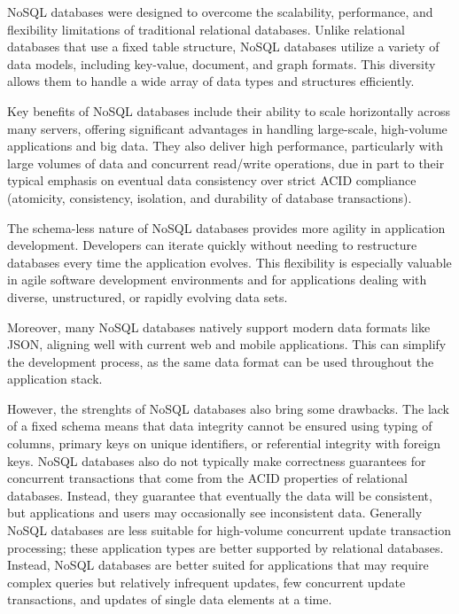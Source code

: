 NoSQL databases were designed to overcome the scalability, performance, and flexibility limitations of traditional relational databases. Unlike relational databases that use a fixed table structure, NoSQL databases utilize a variety of data models, including key-value, document, and graph formats. This diversity allows them to handle a wide array of data types and structures efficiently.

Key benefits of NoSQL databases include their ability to scale horizontally across many servers, offering significant advantages in handling large-scale, high-volume applications and big data. They also deliver high performance, particularly with large volumes of data and concurrent read/write operations, due in part to their typical emphasis on eventual data consistency over strict ACID compliance (atomicity, consistency, isolation, and durability of database transactions).

The schema-less nature of NoSQL databases provides more agility in application development. Developers can iterate quickly without needing to restructure databases every time the application evolves. This flexibility is especially valuable in agile software development environments and for applications dealing with diverse, unstructured, or rapidly evolving data sets.

Moreover, many NoSQL databases natively support modern data formats like JSON, aligning well with current web and mobile applications. This can simplify the development process, as the same data format can be used throughout the application stack.

However, the strenghts of NoSQL databases also bring some drawbacks. The lack of a fixed schema means that data integrity cannot be ensured using typing of columns, primary keys on unique identifiers, or referential integrity with foreign keys. NoSQL databases also do not typically make correctness guarantees for concurrent transactions that come from the ACID properties of relational databases. Instead, they guarantee that eventually the data will be consistent, but applications and users may occasionally see inconsistent data. Generally NoSQL databases are less suitable for high-volume concurrent update transaction processing; these application types are better supported by relational databases. Instead, NoSQL databases are better suited for applications that may require complex queries but relatively infrequent updates, few concurrent update transactions, and updates of single data elements at a time.

